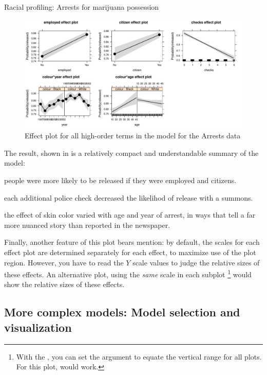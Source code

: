\documentclass[11pt]{book}
\renewenvironment{knitrout}{\small\renewcommand{\baselinestretch}{.85}}{} %
\begin{document}
\begin{Example}[arrests]{Racial profiling: Arrests for marijuana possession}
\begin{knitrout}
\begin{figure}[!htbp]
\centerline{\includegraphics[width=\textwidth]{ch07/fig/arrests-all} }

\caption[Effect plot for all high-order terms in the model for the Arrests data]{Effect plot for all high-order terms in the model for the Arrests data\label{fig:arrests-all}}
\end{figure}


\end{knitrout}

The result, shown in  is a relatively compact and understandable
summary of the  model:
\begin{seriate}
  \item people were more likely to be released if they were employed and citizens.
  \item each additional police check decreased the likelihod of release with a summons.
  \item the effect of skin color varied with age and year of arrest, in ways that
  tell a far more nuanced story than reported in the newspaper.
\end{seriate}

Finally, another feature of this plot bears mention:  by default, the scales for each
effect plot are determined separately for each effect, to maximize use of the plot region.
However, you have to read the $Y$ scale values to judge the relative sizes of these effects.
An alternative plot, using the \emph{same} scale in each subplot%
\footnote{
With the , you can set the  argument to equate the 
vertical range for all plots.  For this plot,  would work.
}
would show the relative sizes of these effects.

\end{Example}

\subsection{More complex models: Model selection and visualization}\label{sec:complex}
\end{document}
